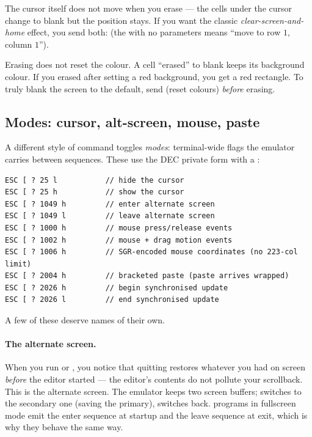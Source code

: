 The cursor itself does not move when you erase --- the cells under the
cursor change to blank but the position stays. If you want the
classic \emph{clear-screen-and-home} effect, you send both:
\code{ESC [ 2 J ESC [ H} (the  with no parameters means ``move
to row $1$, column $1$'').

\begin{warning}
Erasing does not reset the colour. A cell ``erased'' to blank keeps
its background colour. If you erased after setting a red background,
you get a red rectangle. To truly blank the screen to the default,
send \code{ESC [ 0 m} (reset colours) \emph{before} erasing.
\end{warning}

\subsection{Modes: cursor, alt-screen, mouse, paste}

A different style of command toggles \emph{modes}: terminal-wide flags
the emulator carries between sequences. These use the DEC private form
with a :

\begin{lstlisting}
ESC [ ? 25 l           // hide the cursor
ESC [ ? 25 h           // show the cursor
ESC [ ? 1049 h         // enter alternate screen
ESC [ ? 1049 l         // leave alternate screen
ESC [ ? 1000 h         // mouse press/release events
ESC [ ? 1002 h         // mouse + drag motion events
ESC [ ? 1006 h         // SGR-encoded mouse coordinates (no 223-col limit)
ESC [ ? 2004 h         // bracketed paste (paste arrives wrapped)
ESC [ ? 2026 h         // begin synchronised update
ESC [ ? 2026 l         // end synchronised update
\end{lstlisting}

A few of these deserve names of their own.

\paragraph{The alternate screen.}
When you run  or , you notice that quitting
restores whatever you had on screen \emph{before} the editor started
--- the editor's contents do not pollute your scrollback. This is the
alternate screen. The emulator keeps two screen buffers;  switches to the secondary one (saving the primary), 
switches back. \maya{} programs in fullscreen mode emit the enter
sequence at startup and the leave sequence at exit, which is why they
behave the same way.

